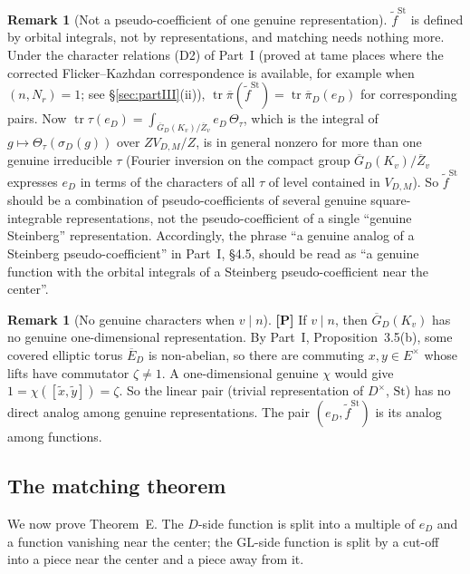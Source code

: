 \documentclass[12pt]{article}
\newcommand{\ov}[1]{\overline{#1}}
\newcommand{\tr}{\operatorname{tr}}
\newcommand{\GL}{\mathrm{GL}}
\newcommand{\St}{\mathrm{St}}
\newcommand{\Zb}{\ov{Z}}
\newcommand{\GDb}{\ov{G}_D}
\newcommand{\pib}{\ov{\pi}}
\newcommand{\Eb}{\ov{E}}
\newcommand{\sg}{\sigma}
\newcommand{\Pv}{\textbf{[P]}}
\theoremstyle{plain}
\theoremstyle{definition}
\newtheorem{remark}[theorem]{Remark}
\begin{document}
\begin{remark}[Not a pseudo-coefficient of one genuine representation]\label{rem:notpc}
$\tilde f^{\St}$ is defined by orbital integrals, not by representations, and matching needs nothing more. Under the character relations (D2) of Part~I (proved at tame places where the corrected Flicker--Kazhdan correspondence is available, for example when $(n,N_r)=1$; see \S\ref{sec:partIII}(ii)), $\tr\pib(\tilde f^{\St})=\tr\pib_D(e_D)$ for corresponding pairs. Now $\tr\tau(e_D)=\int_{\GDb(K_v)/\Zb_v}e_D\,\Theta_\tau$, which is the integral of $g\mapsto\Theta_\tau(\sg_D(g))$ over $ZV_{D,M}/Z$, is in general nonzero for more than one genuine irreducible $\tau$ (Fourier inversion on the compact group $\GDb(K_v)/\Zb_v$ expresses $e_D$ in terms of the characters of all $\tau$ of level contained in $V_{D,M}$). So $\tilde f^{\St}$ should be a combination of pseudo-coefficients of several genuine square-integrable representations, not the pseudo-coefficient of a single ``genuine Steinberg'' representation. Accordingly, the phrase ``a genuine analog of a Steinberg pseudo-coefficient'' in Part~I, \S4.5, should be read as ``a genuine function with the orbital integrals of a Steinberg pseudo-coefficient near the center''.
\end{remark}

\begin{remark}[No genuine characters when $v\mid n$]\label{rem:nochar}\Pv
If $v\mid n$, then $\GDb(K_v)$ has no genuine one-dimensional representation. By Part~I, Proposition~3.5(b), some covered elliptic torus $\Eb_D$ is non-abelian, so there are commuting $x,y\in E^\times$ whose lifts have commutator $\zeta\ne1$. A one-dimensional genuine $\chi$ would give $1=\chi([\tilde x,\tilde y])=\zeta$. So the linear pair (trivial representation of $D^\times$, $\St$) has no direct analog among genuine representations. The pair $(e_D,\tilde f^{\St})$ is its analog among functions.
\end{remark}


\subsection{The matching theorem}\label{subsec:matchthm}
We now prove Theorem~E. The $D$-side function is split into a multiple of $e_D$ and a function vanishing near the center; the $\GL$-side function is split by a cut-off into a piece near the center and a piece away from it.
\end{document}
